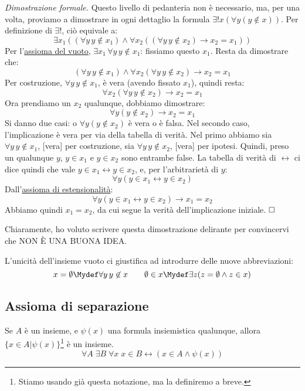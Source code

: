 \documentclass[11pt]{scrartcl}
\begin{document}
\emph{Dimostrazione formale.} Questo livello di pedanteria non è necessario, ma, per una volta, proviamo a dimostrare in ogni dettaglio la formula $\exists ! x (\forall y (y \not \in x))$. Per definizione di $\exists !$, ciò equivale a:
\[ \exists x_1 ((\forall y \, y \not \in x_1) \land \forall x_2 ((\forall y \, y \not \in x_2) \rightarrow x_2 = x_1))
	\]
Per l'\hyperref[ax1]{assioma del vuoto}, $\exists x_1 \, \forall y \, y \not \in x_1$: fissiamo questo $x_1$. Resta da dimostrare che:
\[ (\forall y \, y \not \in x_1) \land \forall x_2(\forall y \, y \not \in x_2) \rightarrow x_2 = x_1
	\]
Per costruzione, $\forall y \, y \not\in x_1$, è vera (avendo fissato $x_1$), quindi resta:
\[ \forall x_2 (\forall y \, y \not \in x_2) \rightarrow x_2 = x_1
	\]
Ora prendiamo un $x_2$ qualunque, dobbiamo dimostrare:
\[ \forall y (y \not \in x_2) \rightarrow x_2 = x_1
	\]
Si danno due casi: o $\forall y (y \not \in x_2)$ è vera o è falsa. Nel secondo caso, l'implicazione è vera per via della tabella di verità. Nel primo abbiamo sia $\forall y \, y \not \in x_1$, [vera] per
costruzione, sia $\forall y \, y \not \in x_2$, [vera] per ipotesi. Quindi, preso un qualunque $y$, $y \in x_1$ e $y \in x_2$ sono entrambe false. La tabella di verità di $\leftrightarrow$ ci dice quindi che vale $y \in x_1 \leftrightarrow y \in x_2$, e, per 
l'arbitrarietà di $y$:
\[ \forall y (y \in x_1 \leftrightarrow y \in x_2)
	\]
Dall'\hyperref[ax2]{assioma di estensionalità}:
\[ \forall y (y \in x_1 \leftrightarrow y \in x_2) \rightarrow x_1 = x_2
	\]
Abbiamo quindi $x_1 = x_2$, da cui segue la verità dell'implicazione iniziale. $\hfill\square$


Chiaramente, ho voluto scrivere questa dimostrazione delirante per convincervi che NON È UNA BUONA IDEA.

\begin{notation}
L'unicità dell'insieme vuoto ci giustifica ad introdurre delle nuove abbreviazioni:
\[ x = \emptyset \Mydef \forall y \, y \not\in x \qquad \emptyset \in x \Mydef \exists z (z = \emptyset \land z \in x)
	\]
\end{notation}

\subsection{Assioma di separazione}
\begin{axiom}
\label{ax3}
Se $A$ è un insieme, e $\psi(x)$ una formula insiemistica qualunque, allora $\{x \in A | \psi (x)\}$\footnote{Stiamo usando già questa notazione, ma la definiremo a breve.} è un insieme.
\[ \forall A \; \exists B \; \forall x \; x \in B \leftrightarrow (x \in A \land \psi (x))
	\]
\end{axiom}
\end{document}
